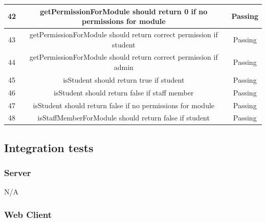 \documentclass[a4paper,12pt]{article}
\begin{document}
\begin{tabular}{ |c|c|c| }
    			\hline
   				42 & getPermissionForModule should return 0 if no permissions for module & Passing\\
    			\hline
   				43 & getPermissionForModule should return correct permission if student & Passing\\
    			\hline
 				44 & getPermissionForModule should return correct permission if admin & Passing\\
    			\hline
  				45 & isStudent should return true if student & Passing\\
    			\hline
  				46 & isStudent should return false if staff member & Passing\\
    			\hline
  				47 & isStudent should return false if no permissions for module & Passing\\
    			\hline
    			48 & isStaffMemberForModule should return false if student & Passing\\
    			\hline
    		\end{tabular}
    	
        \subsection{Integration tests}
        
        	\subsubsection{Server}
        	
        	N/A
        	
        	\subsubsection{Web Client}
        
\end{document}
